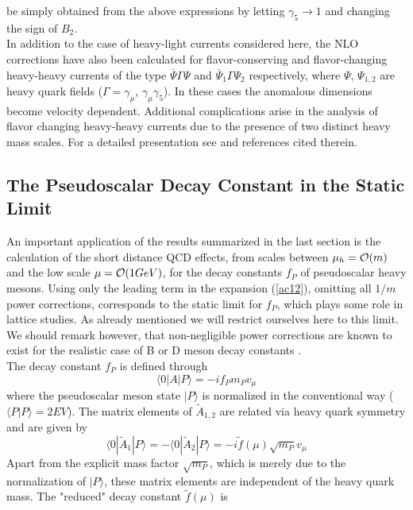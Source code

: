 be simply obtained from the above expressions by letting $\gamma_5\to 1$
and changing the sign of $B_2$.
\\
In addition to the case of heavy-light currents considered here, the
NLO corrections have also been calculated for flavor-conserving and
flavor-changing heavy-heavy currents of the type $\bar\Psi\Gamma\Psi$
and $\bar\Psi_1\Gamma\Psi_2$ respectively, where $\Psi$, $\Psi_{1,2}$
are heavy quark fields ($\Gamma=\gamma_\mu$, $\gamma_\mu\gamma_5$). In
these cases the anomalous dimensions become velocity dependent.
Additional complications arise in the analysis of flavor changing
heavy-heavy currents due to the presence of two distinct heavy mass
scales. For a detailed presentation see \cite{neubert:94} and
references cited therein.

\subsection{The Pseudoscalar Decay Constant in the Static Limit}
\label{sec:HQET:DecCons}
An important application of the results summarized in the last
section is the calculation of the short distance QCD effects, from
scales between $\mu_h={\cal O}(m)$ and the low scale $\mu={\cal O}(1 GeV)$,
for the decay constants $f_P$ of pseudoscalar heavy mesons. Using only
the leading term in the expansion (\ref{ac12}), omitting all $1/m$
power corrections, corresponds to the static limit for $f_P$, which plays
some role in lattice studies. As already mentioned we will restrict
ourselves here to this limit. We should remark however, that
non-negligible power corrections are known to exist for the realistic case 
of B or D meson decay constants \cite{sachrajda:92}.
\\
The decay constant $f_P$ is defined through
\begin{equation}\label{apme}
\langle 0|A|P\rangle =-i f_P m_P v_\mu
\end{equation}
where the pseudoscalar meson state $|P\rangle$ is normalized in the
conventional way ($\langle P|P\rangle=2 E V$). The matrix elements of
$\tilde A_{1,2}$ are related via heavy quark symmetry and are given by
\begin{equation}\label{atme}
\langle 0|\tilde A_1|P\rangle =-\langle 0|\tilde A_2|P\rangle =
  -i \tilde f(\mu) \sqrt{m_P} v_\mu
\end{equation}
Apart from the explicit mass factor $\sqrt{m_P}$, which is merely due to
the normalization of $|P\rangle$, these matrix elements are independent
of the heavy quark mass. The "reduced" decay constant $\tilde f(\mu)$ is
